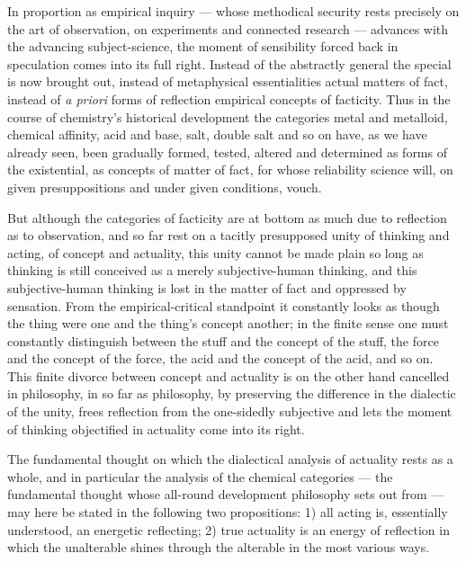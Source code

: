 \documentclass[12pt,a4paper]{book}
\begin{document}
In proportion as empirical inquiry --- whose methodical security rests
precisely on the art of observation, on experiments and connected research ---
advances with the advancing subject-science, the moment of sensibility forced
back in speculation comes into its full right. Instead of the abstractly
general the special is now brought out, instead of metaphysical essentialities
actual matters of fact, instead of \textit{a priori} forms of reflection
empirical concepts of facticity. Thus in the course of chemistry's historical
development the categories metal and metalloid, chemical affinity, acid and
base, salt, double salt and so on have, as we have already seen, been gradually
formed, tested, altered and determined as forms of the existential, as concepts
of matter of fact, for whose reliability science will, on given presuppositions
and under given conditions, vouch.

But although the categories of facticity are at bottom as much due to
reflection as to observation, and so far rest on a tacitly presupposed unity of
thinking and acting, of concept and actuality, this unity cannot be made plain
so long as thinking is still conceived as a merely subjective-human thinking,
and this subjective-human thinking is lost in the matter of fact and oppressed
by sensation. From the empirical-critical standpoint it constantly looks as
though the thing were one and the thing's concept another; in the finite sense
one must constantly distinguish between the stuff and the concept of the stuff,
the force and the concept of the force, the acid and the concept of the acid,
and so on. This finite divorce between concept and actuality is on the other
hand cancelled in philosophy, in so far as philosophy, by preserving the
difference in the dialectic of the unity,
frees reflection from the one-sidedly subjective and lets the moment of
thinking objectified in actuality come into its right.

The fundamental thought on which the dialectical analysis of actuality rests as
a whole, and in particular the analysis of the chemical categories --- the
fundamental thought whose all-round development philosophy sets out from ---
may here be stated in the following two propositions: 1) all acting is,
essentially understood, an energetic reflecting; 2) true actuality is an energy
of reflection in which the unalterable shines through the alterable in the most
various ways.
\end{document}
